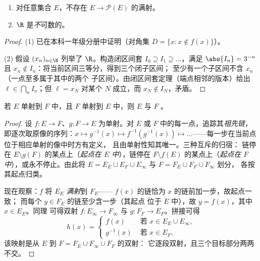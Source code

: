 \begin{theorem}[康托；$\R$ 的不可数性]\label{thm:b2:structures:cantor}
\begin{enumerate}
  \item 对任意集合 $E$，不存在 $E \to
        \mathcal{P}(E)$ 的满射。
  \item $\R$ 是\emph{不}可数的。
\end{enumerate}
\end{theorem}

\begin{proof}
(1) 已在本科一年级分册中证明（对角集 $D = \{x : x
\notin f(x)\}$）。

(2) 假设 $(x_n)_{n \in \N}$ 列举了 $\R$。构造闭区间套
$I_0 \supseteq I_1 \supseteq \dots$，满足 $\abs{I_n} = 3^{-n}$ 且
$x_n \notin I_n$：将当前区间三等分，得到三个闭子区间；
至少有一个子区间不含 $x_n$（一点至多属于其中的两个
子区间）。由闭区间套定理（端点相邻的版本）给出
$\ell \in \bigcap_n I_n$；但 $\ell = x_N$ 对某个 $N$ 成立，而 $x_N
\notin I_N$，矛盾。
\end{proof}

\begin{theorem}[康托--伯恩斯坦]\label{thm:b2:structures:cantorbernstein}
若 $E$ 单射到 $F$ 中，且 $F$ 单射到 $E$ 中，则 $E$ 与 $F$
。
\end{theorem}

\begin{proof}
设 $f \colon E \to F$、$g \colon F \to E$ 为单射。对
$E$ 或 $F$ 中的每一点，追踪其\emph{祖先链}，
即逐次取原像的序列：$x \mapsto g^{-1}(x) \mapsto
f^{-1}(g^{-1}(x)) \mapsto \dots$——每一步在当前点
位于相应单射的像中时方有定义，
且由单射性知其唯一。三种互斥的归宿：
链停在 $E \setminus g(F)$ 的某点上（\emph{起点在
$E$ 中}），链停在 $F \setminus f(E)$ 的某点上（\emph{起点在
$F$ 中}），或永不停止。由此将 $E = E_E \cup E_F \cup
E_\infty$ 与 $F = F_E \cup F_F \cup F_\infty$ 划分，
各按其起点归类。

现在观察：$f$ 将 $E_E$ \emph{满射}到 $F_E$——
$f(x)$ 的链恰为 $x$ 的链前加一步，故起点一致；
而每个 $y \in F_E$ 的链至少含一步（其起点
位于 $E$ 中），故 $y = f(x)$，其中 $x \in E_E$。同理
可得双射 $f \colon E_\infty \to F_\infty$ 与 $g \colon F_F
\to E_F$。拼接可得
\[
h(x) =
\begin{cases}
f(x) & \text{ 若 } x \in E_E \cup E_\infty,\\
g^{-1}(x) & \text{ 若 } x \in E_F,
\end{cases}
\]
该映射是从 $E$ 到 $F = F_E \cup F_\infty \cup F_F$ 的双射：
它逐段双射，且三个目标部分两两不交。
\end{proof}

